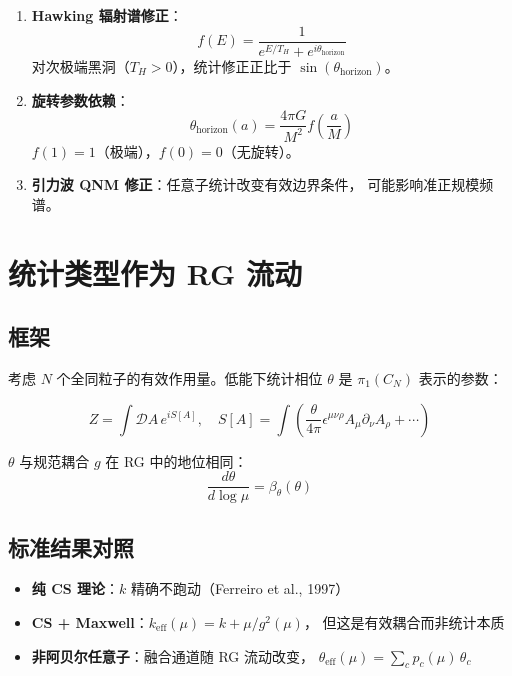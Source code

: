 \documentclass[11pt,a4paper]{article}
\begin{document}
\begin{enumerate}
\item \textbf{Hawking 辐射谱修正}：
\begin{equation}
f(E) = \frac{1}{e^{E/T_H} + e^{i\theta_{\text{horizon}}}}
\end{equation}
对次极端黑洞（$T_H > 0$），统计修正正比于
$\sin(\theta_{\text{horizon}})$。

\item \textbf{旋转参数依赖}：
\begin{equation}
\theta_{\text{horizon}}(a) = \frac{4\pi G}{M^2} f\!\left(\frac{a}{M}\right)
\end{equation}
$f(1)=1$（极端），$f(0)=0$（无旋转）。

\item \textbf{引力波 QNM 修正}：任意子统计改变有效边界条件，
可能影响准正规模频谱。
\end{enumerate}

\section{统计类型作为 RG 流动}

\subsection{框架}

考虑 $N$ 个全同粒子的有效作用量。低能下统计相位 $\theta$ 是
$\pi_1(C_N)$ 表示的参数：

\begin{equation}
Z = \int \mathcal{D}A\, e^{iS[A]},\quad S[A] = \int\left(
\frac{\theta}{4\pi}\epsilon^{\mu\nu\rho}A_\mu\partial_\nu A_\rho + \cdots\right)
\end{equation}

\begin{proposition}
$\theta$ 与规范耦合 $g$ 在 RG 中的地位相同：
\begin{equation}
\frac{d\theta}{d\log\mu} = \beta_\theta(\theta)
\end{equation}
\end{proposition}

\subsection{标准结果对照}

\begin{itemize}
\item \textbf{纯 CS 理论}：$k$ 精确不跑动（Ferreiro et al., 1997）
\item \textbf{CS + Maxwell}：$k_{\text{eff}}(\mu) = k + \mu/g^2(\mu)$，
但这是有效耦合而非统计本质
\item \textbf{非阿贝尔任意子}：融合通道随 RG 流动改变，
$\theta_{\text{eff}}(\mu) = \sum_c p_c(\mu)\,\theta_c$
\end{itemize}
\end{document}
